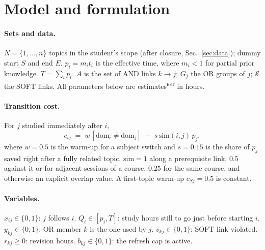 \documentclass[11pt,a4paper]{article}
\newcommand{\est}{\textsuperscript{\textsc{est}}}
\begin{document}
\section{Model and formulation}
\label{sec:model}
\paragraph{Sets and data.} $N=\{1,\dots,n\}$ topics in the student's scope (after closure, Sec.~\ref{sec:data}); dummy start $S$ and end $E$. $p_i=m_it_i$ is the effective time, where $m_i<1$ for partial prior knowledge. $T=\sum_i p_i$. $A$ is the set of AND links $k\to j$; $G_j$ the OR groups of $j$; $\mathcal{S}$ the SOFT links. All parameters below are estimates\est{} in hours.

\paragraph{Transition cost.} For $j$ studied immediately after $i$,
\[
c_{ij} \;=\; w\,[\mathrm{dom}_i\neq\mathrm{dom}_j] \;-\; s\,\mathrm{sim}(i,j)\,p_j ,
\]
where $w=0.5$ is the warm-up for a subject switch and $s=0.15$ is the share of $p_j$ saved right after a fully related topic. $\mathrm{sim}=1$ along a prerequisite link, $0.5$ against it or for adjacent sessions of a course, $0.25$ for the same course, and otherwise an explicit overlap value. A first-topic warm-up $c_{Sj}=0.5$ is constant.

\paragraph{Variables.} $x_{ij}\in\{0,1\}$: $j$ follows $i$. $Q_i\in[p_i,T]$: study hours still to go just before starting $i$. $y_{kj}\in\{0,1\}$: OR member $k$ is the one used by $j$. $v_{kj}\in\{0,1\}$: SOFT link violated. $r_{kj}\ge 0$: revision hours. $b_{kj}\in\{0,1\}$: the refresh cap is active.
\end{document}
